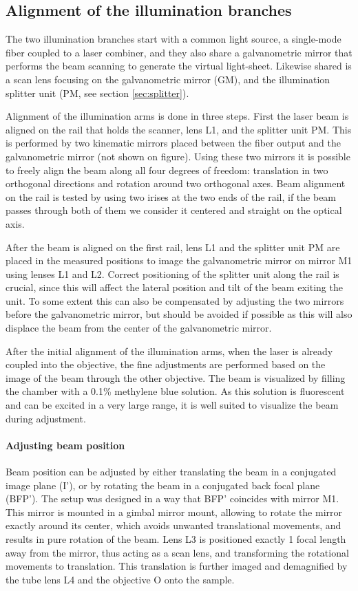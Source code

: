   \subsection{Alignment of the illumination branches}

    The two illumination branches start with a common light source, a single-mode fiber coupled to a laser combiner, and they also share a galvanometric mirror that performs the beam scanning to generate the virtual light-sheet. Likewise shared is a scan lens focusing on the galvanometric mirror (GM), and the illumination splitter unit (PM, see section \ref{sec:splitter}).

    Alignment of the illumination arms is done in three steps. First the laser beam is aligned on the rail that holds the scanner, lens L1, and the splitter unit PM. This is performed by two kinematic mirrors placed between the fiber output and the galvanometric mirror (not shown on figure). Using these two mirrors it is possible to freely align the beam along all four degrees of freedom: translation in two orthogonal directions and rotation around two orthogonal axes. Beam alignment on the rail is tested by using two irises at the two ends of the rail, if the beam passes through both of them we consider it centered and straight on the optical axis.

    After the beam is aligned on the first rail, lens L1 and the splitter unit PM are placed in the measured positions to image the galvanometric mirror on mirror M1 using lenses L1 and L2. Correct positioning of the splitter unit along the rail is crucial, since this will affect the lateral position and tilt of the beam exiting the unit. To some extent this can also be compensated by adjusting the two mirrors before the galvanometric mirror, but should be avoided if possible as this will also displace the beam from the center of the galvanometric mirror.

    After the initial alignment of the illumination arms, when the laser is already coupled into the objective, the fine adjustments are performed based on the image of the beam through the other objective. The beam is visualized by filling the chamber with a 0.1\% methylene blue solution. As this solution is fluorescent and can be excited in a very large range, it is well suited to visualize the beam during adjustment.

    \paragraph{Adjusting beam position}
      Beam position can be adjusted by either translating the beam in a conjugated image plane (I'), or by rotating the beam in a conjugated back focal plane (BFP'). The setup was designed in a way that BFP' coincides with mirror M1. This mirror is mounted in a gimbal mirror mount, allowing to rotate the mirror exactly around its center, which avoids unwanted translational movements, and results in pure rotation of the beam. Lens L3 is positioned exactly 1 focal length away from the mirror, thus acting as a scan lens, and transforming the rotational movements to translation. This translation is further imaged and demagnified by the tube lens L4 and the objective O onto the sample.


